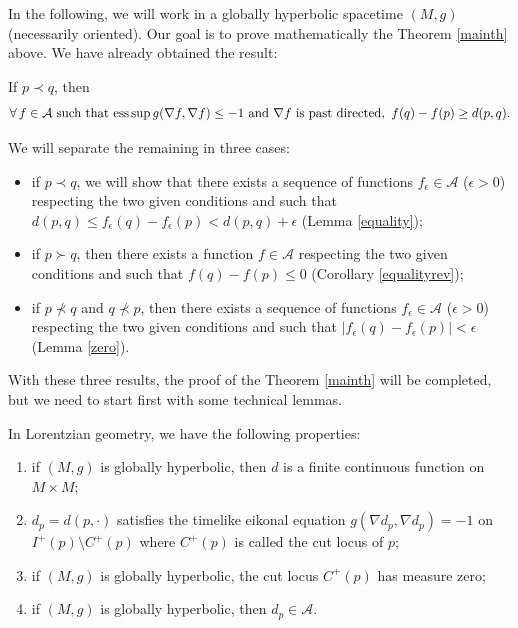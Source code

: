 \documentclass[pdftex]{sigma}
\newcommand{\abs}[1]{\left\vert {#1} \right\vert}
\begin{document}
In the following, we will work in a globally hyperbolic spacetime $(M,g)$ (necessarily oriented). Our goal is to prove mathematically the Theorem \ref{mainth} above. We have already obtained the result:

\begin{lemma}\label{lemmainequa}
If $p \prec q$, then
\begin{gather*}
\forall \, f \in \mathcal A\text{ such that } \text{\rm ess} \sup g( \nabla f, \nabla f ) \leq -1   \text{ and }  \nabla f \text{ is past directed}, \  f(q)-f(p)   \geq  d(p,q).
\end{gather*}
\end{lemma}

We will separate the remaining in three cases:
\begin{itemize}\itemsep=0pt
\item if $p \prec q$, we will show that there exists a sequence of functions $f_\epsilon \in\mathcal A$ ($\epsilon > 0$) respecting the two given conditions and such that $d(p,q) \leq f_\epsilon(q) -f_\epsilon(p) < d(p,q) + \epsilon$ (Lemma \ref{equality});
\item if $p \succ q$, then there exists a function $f \in\mathcal A$ respecting the two given conditions and such that \mbox{$f(q)-f(p) \leq 0$} (Corollary \ref{equalityrev});
\item if $p \nprec q$ and $q \nprec p$, then there exists a sequence of functions $f_\epsilon \in\mathcal A$ ($\epsilon > 0$) respecting the two given conditions and such that $\abs{ f_\epsilon(q) -f_\epsilon(p) } < \epsilon$ (Lemma \ref{zero}).
\end{itemize}

With these three results, the proof of the Theorem \ref{mainth} will be completed, but we need to start f\/irst with some technical lemmas.

\begin{lemma}
In Lorentzian geometry, we have the following properties:
\begin{enumerate}\itemsep=0pt
\item if $(M,g)$ is globally hyperbolic, then $d$ is a finite continuous function on $M \times M$;

\item $d_p = d(p,\cdot) $ satisfies the timelike eikonal equation $g( \nabla d_p , \nabla d_p) = -1$ on $I^+(p) \setminus C^+(p)$ where $C^+(p)$ is called the cut locus of $p$;

\item if $(M,g)$ is globally hyperbolic, the cut locus  $C^+(p)$ has measure zero;

\item  if $(M,g)$ is globally hyperbolic, then $d_p\in\mathcal A$.
\end{enumerate}
\end{lemma}
\end{document}
